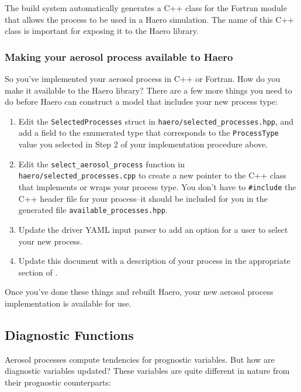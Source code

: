 The build system automatically generates a C++ class for the Fortran module that
allows the process to be used in a Haero simulation. The name of this C++ class
is important for exposing it to the Haero library.

\subsubsection{Making your aerosol process available to Haero}

So you've implemented your aerosol process in C++ or Fortran. How do you
make it available to the Haero library? There are a few more things you need to
do before Haero can construct a model that includes your new process type:

\begin{enumerate}
  \item Edit the \texttt{SelectedProcesses} struct in
        \texttt{haero/selected\_processes.hpp}, and add a field to the enumerated
        type that corresponds to the \texttt{ProcessType} value you selected in
        Step 2 of your implementation procedure above.
  \item Edit the \texttt{select\_aerosol\_process} function in
        \texttt{haero/selected\_processes.cpp} to create a new pointer to the C++
        class that implements or wraps your process type. You don't have to
        \texttt{\#include} the C++ header file for your process--it should be
        included for you in the generated file \texttt{available\_processes.hpp}.
  \item Update the driver YAML input parser to add an option for a user
        to select your new process.
  \item Update this document with a description of your process in the
        appropriate section of .
\end{enumerate}

Once you've done these things and rebuilt Haero, your new aerosol process
implementation is available for use.

\subsection{Diagnostic Functions}

Aerosol processes compute tendencies for prognostic variables. But how are
diagnostic variables updated? These variables are quite different in nature from
their prognostic counterparts:

